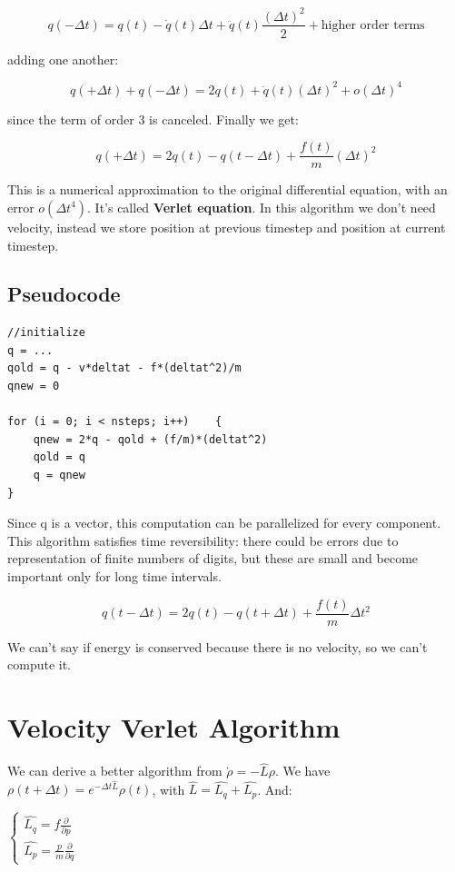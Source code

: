 \documentclass[a4paper, italian, openany]{book}
\begin{document}
$$q( -\Delta t) = q(t) - \dot{q}(t) \Delta t + \ddot{q} (t) \frac{(\Delta t)^2}{2} + \mbox{higher order terms}$$

adding one another:

$$q( +\Delta t)  + q( -\Delta t) = 2q(t) +\ddot{q}(t)(\Delta t)^2 + o(\Delta t)^4$$

since the term of order 3 is canceled. Finally we get:

$$q( +\Delta t) = 2q(t) -q(t - \Delta t) + \frac{f(t)}{m} (\Delta t)^2$$

This is a numerical approximation to the original differential equation, with an error $o(\Delta t^4)$. It's called \textbf{Verlet equation}.\newline
In this algorithm we don't need velocity, instead we store position at previous timestep and position at current timestep.

\subsection{Pseudocode}

\begin{lstlisting}
//initialize
q = ... 
qold = q - v*deltat - f*(deltat^2)/m
qnew = 0

for (i = 0; i < nsteps; i++)	{
	qnew = 2*q - qold + (f/m)*(deltat^2)
	qold = q
	q = qnew
}
\end{lstlisting}

Since q is a vector, this computation can be parallelized for every component.\newline
This algorithm satisfies time reversibility: there could be errors due to representation of finite numbers of digits, but these are small and become important only for long time intervals.

$$q(t-\Delta t) = 2q(t) -q(t +\Delta t) + \frac{f(t)}{m}\Delta t^2$$

We can't say if energy is conserved because there is no velocity, so we can't compute it.

\section{Velocity Verlet Algorithm}

We can derive a better algorithm from $\dot{\rho} = -\hat{L} \rho$.\newline
We have $\rho(t+\Delta t) = e^{-\Delta t \hat{L}} \rho(t)$, with $\hat{L}=\hat{L_q} + \hat{L_p}$. And:

$\begin{cases}
\hat{L_q} = f\frac{\partial}{\partial p} \\
\hat{L_p} = \frac{p}{m}\frac{\partial}{\partial q}
\end{cases}$
\end{document}
